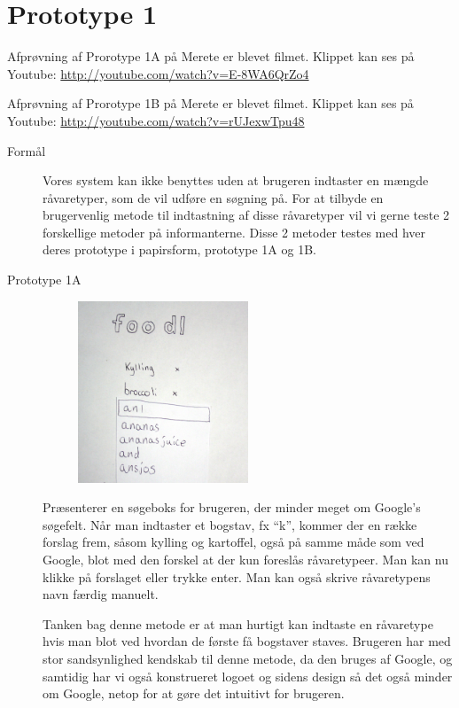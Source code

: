\section{Prototype 1}
\label{ap:prototype1}

Afprøvning af Prorotype 1A på Merete er blevet filmet. Klippet kan ses på Youtube: \url{http://youtube.com/watch?v=E-8WA6QrZo4}

Afprøvning af Prorotype 1B på Merete er blevet filmet. Klippet kan ses på Youtube: \url{http://youtube.com/watch?v=rUJexwTpu48}

\begin{description}
\item[Formål] Vores system kan ikke benyttes uden at brugeren indtaster en mængde råvaretyper, som de vil udføre en søgning på. For at tilbyde en brugervenlig metode til indtastning af disse råvaretyper vil vi gerne teste 2 forskellige metoder på informanterne. Disse 2 metoder testes med hver deres prototype i papirsform, prototype 1A og 1B.
\item[Prototype 1A]

\begin{figure}[H]
\centering
\includegraphics[width=0.5\textwidth]{billeder/prototyper/prototype1a.jpg}
\label{fig:prototype1a}
\end{figure}

Præsenterer en søgeboks for brugeren, der minder meget om Google’s søgefelt. Når man indtaster et bogstav, fx “k”, kommer der en række forslag frem, såsom kylling og kartoffel, også på samme måde som ved Google, blot med den forskel at der kun foreslås råvaretypeer. Man kan nu klikke på forslaget eller trykke enter. Man kan også skrive råvaretypens navn færdig manuelt.

Tanken bag denne metode er at man hurtigt kan indtaste en råvaretype hvis man blot ved hvordan de første få bogstaver staves. Brugeren har med stor sandsynlighed kendskab til denne metode, da den bruges af Google, og samtidig har vi også konstrueret logoet og sidens design så det også minder om Google, netop for at gøre det intuitivt for brugeren.


\end{description}
